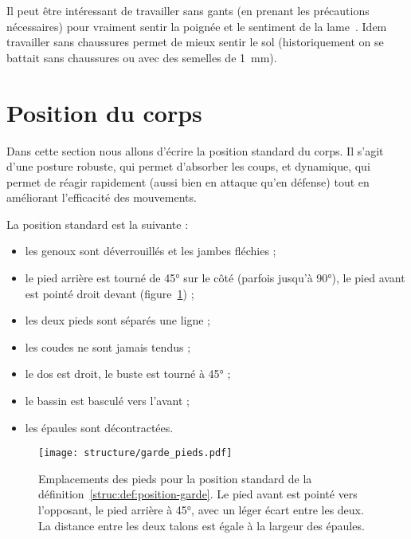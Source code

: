Il peut être intéressant de travailler sans gants (en prenant les précautions nécessaires) pour vraiment sentir la poignée et le sentiment de la lame~\cite{enzi:dijon:messer_inner:2015}.
Idem travailler sans chaussures permet de mieux sentir le sol (historiquement on se battait sans chaussures ou avec des semelles de \SI{1}{mm}).


\section{Position du corps}


Dans cette section nous allons d'écrire la position standard du corps.
Il s'agit d'une posture robuste, qui permet d'absorber les coups, et dynamique, qui permet de réagir rapidement (aussi bien en attaque qu'en défense) tout en améliorant l'efficacité des mouvements.


\begin{definition}
\label{struc:def:position-garde}

\noindent
La position standard est la suivante :
\begin{itemize}
	\item les genoux sont déverrouillés et les jambes fléchies ;
	\item le pied arrière est tourné de \ang{45} sur le côté (parfois jusqu'à 90°), le pied avant est pointé droit devant (figure~\ref{struc:fig:garde-pieds}) ;
	\item les deux pieds sont séparés une ligne ;
	\item les coudes ne sont jamais tendus ;
	\item le dos est droit, le buste est tourné à \ang{45} ;
	\item le bassin est basculé vers l'avant ;
	\item les épaules sont décontractées.
\end{itemize}
\end{definition}


\begin{figure}[ht]
	\centering
	\texttt{[image: structure/garde\_pieds.pdf]}
	\caption{Emplacements des pieds pour la position standard de la définition~\ref{struc:def:position-garde}.
	Le pied avant est pointé vers l'opposant, le pied arrière à \ang{45}, avec un léger écart entre les deux.
	La distance entre les deux talons est égale à la largeur des épaules.}
	\label{struc:fig:garde-pieds}
\end{figure}



